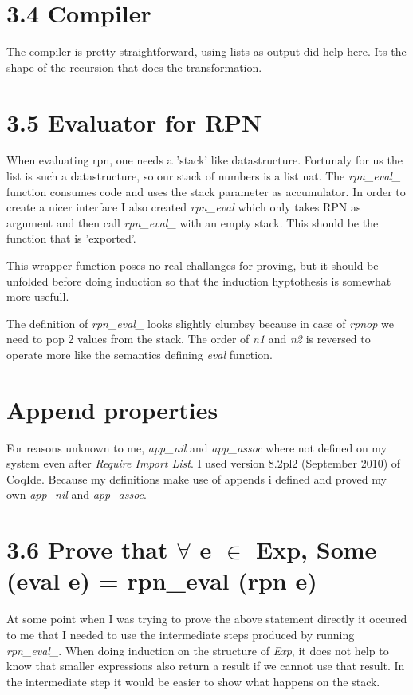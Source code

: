 \documentclass[10pt,a4paper,usenames,dvipnames]{article}
\begin{document}
\section*{3.4 Compiler }
The compiler is pretty straightforward, using lists as output did help here. Its the shape of the recursion that does the transformation.

\section*{3.5 Evaluator for RPN}
When evaluating rpn, one needs a 'stack' like datastructure. Fortunaly for us the list is such a datastructure, so our stack of numbers is a list nat. The \emph{rpn\_eval\_} function consumes code and uses the stack parameter as accumulator. In order to create a nicer interface I also created \emph{rpn\_eval} which only takes RPN as argument and then call \emph{rpn\_eval\_} with an empty stack. This should be the function that is 'exported'.

This wrapper function poses no real challanges for proving, but it should be unfolded before doing induction so that the induction hyptothesis is somewhat more usefull.

The definition of \emph{rpn\_eval\_} looks slightly clumbsy because in case of \emph{rpnop} we need to pop 2 values from the stack. The order of \emph{n1} and \emph{n2} is reversed to operate more like the semantics defining \emph{eval} function.

\section*{ Append properties }

For reasons unknown to me, \emph{app\_nil} and \emph{app\_assoc} where not defined on my system even after \emph{Require Import List}. I used version 8.2pl2 (September 2010) of CoqIde. Because my definitions make use of appends i defined and proved my own \emph{app\_nil} and \emph{app\_assoc}.

\section*{ 3.6 Prove that $\forall$ e $\in$ Exp, Some (eval e) = rpn\_eval (rpn e) }

At some point when I was trying to prove the above statement directly it occured to me that I needed to use the intermediate steps produced by running \emph{rpn\_eval\_}. When doing induction on the structure of \emph{Exp}, it does not help to know that smaller expressions also return a result if we cannot use that result. In the intermediate step it would be easier to show what happens on the stack.
\end{document}
